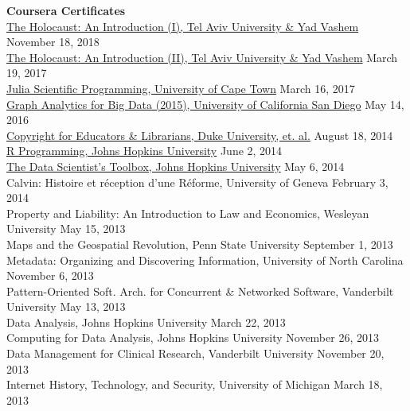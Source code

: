 \documentclass[10pt]{res} %
\begin{document}
\begin{resume}
{\bf Coursera Certificates} \\
\href{https://www.coursera.org/account/accomplishments/certificate/2XCZRUU9MAUD}{The Holocaust: An Introduction (I), Tel Aviv University \& Yad Vashem} \hfill November 18, 2018 \\
\href{https://www.coursera.org/account/accomplishments/certificate/22XN4PKSY2SQ}{The Holocaust: An Introduction (II), Tel Aviv University \& Yad Vashem} \hfill March 19, 2017 \\
\href{https://www.coursera.org/account/accomplishments/certificate/5D7RHC4L3CT5}{Julia Scientific Programming, University of Cape Town} \hfill March 16, 2017 \\
\href{https://www.coursera.org/account/accomplishments/certificate/ZCSPH3L56XZE}{Graph Analytics for Big Data (2015), University of California San Diego} \hfill  May 14, 2016 \\
\href{https://www.coursera.org/account/accomplishments/certificate/ZCSPH3L56XZE}{Copyright for Educators \& Librarians, Duke University, et. al.} \hfill  August 18, 2014 \\
\href{https://www.coursera.org/account/accomplishments/certificate/95J6ERALSD}{R Programming, Johns Hopkins University} \hfill  June 2, 2014 \\
\href{https://www.coursera.org/account/accomplishments/certificate/TDXTJWK9DR}{The Data Scientist’s Toolbox, Johns Hopkins University} \hfill  May 6, 2014 \\ 
Calvin: Histoire et réception d'une Réforme, University of Geneva \hfill  February 3, 2014 \\
Property and Liability: An Introduction to Law and Economics, Wesleyan University \hfill  May 15, 2013 \\
Maps and the Geospatial Revolution, Penn State University \hfill  September 1, 2013 \\
Metadata: Organizing and Discovering Information, University of North Carolina \hfill  November 6, 2013 \\
Pattern-Oriented Soft. Arch. for Concurrent \& Networked Software, Vanderbilt University \hfill  May 13, 2013 \\
Data Analysis, Johns Hopkins University \hfill  March 22, 2013 \\
Computing for Data Analysis, Johns Hopkins University \hfill  November 26, 2013 \\
Data Management for Clinical Research, Vanderbilt University \hfill  November 20, 2013 \\
Internet History, Technology, and Security, University of Michigan \hfill  March 18, 2013


\end{resume}
\end{document}
